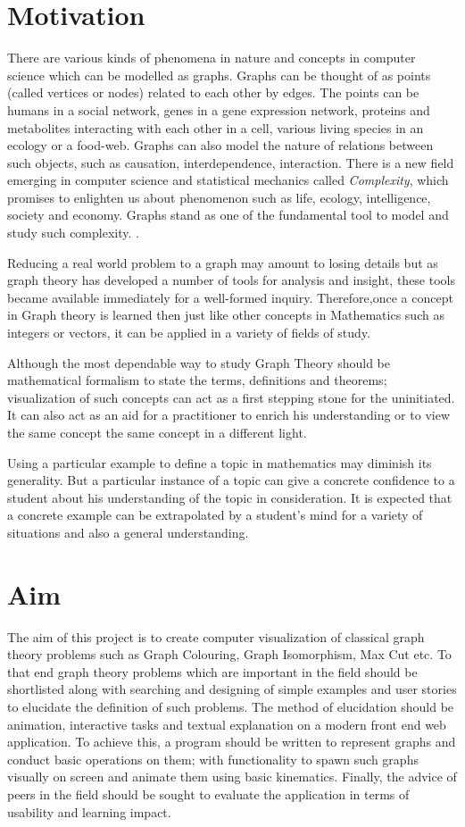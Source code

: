 
\section{Motivation}
There are various kinds of phenomena in nature and concepts in computer science which can
be modelled as graphs. Graphs can be thought of as points (called vertices or
nodes) related to each other by edges. The points can be humans in a social
network, genes in a gene expression network, proteins and metabolites
interacting with each other in a cell, various living species in an ecology or
a food-web. Graphs can also model the nature of relations between such objects, such as causation,
interdependence, interaction.  There is a new field emerging in computer science
and statistical mechanics called \emph{Complexity}, which promises to enlighten
us about phenomenon such as life, ecology, intelligence, society and economy.
Graphs stand as one of the fundamental tool to model and study such complexity. \cite{Gros2015}.

Reducing a real world problem to a graph may amount to losing details but as
graph theory has developed a number of tools for analysis and insight, these
tools became available immediately for a well-formed inquiry. Therefore,once a
concept in Graph theory is learned then just like other concepts in Mathematics
such as integers or vectors, it can be applied in a variety of fields of
study.

Although the most dependable way to study Graph Theory should be mathematical
formalism to state the terms, definitions and theorems; visualization of such
concepts can act as a first stepping stone for the uninitiated. It can also act
as an aid for a practitioner to enrich his understanding or to view the same
concept the same concept in a different light.

Using a particular example to define a topic in mathematics may diminish its
generality. But a particular instance of a topic can give a concrete confidence
to a student about his understanding of the topic in consideration. It is
expected that a concrete example can be extrapolated by a student's mind for a
variety of situations and also a general understanding.

\section{Aim}
The aim of this project is to create computer visualization of classical graph
theory problems such as Graph Colouring, Graph Isomorphism, Max Cut etc. 
To that end graph theory problems which are important in the
field should be shortlisted along with searching and designing of simple
examples and user stories to elucidate the definition of such problems.
The method of elucidation should be animation, interactive tasks and textual
explanation on a modern front end web application. To achieve this, a program
should be written to represent graphs and conduct basic operations on them;
with functionality to spawn such graphs visually on screen and
animate them using basic kinematics. Finally, the advice of peers in the field should be sought to evaluate the
application in terms of usability and learning impact.

